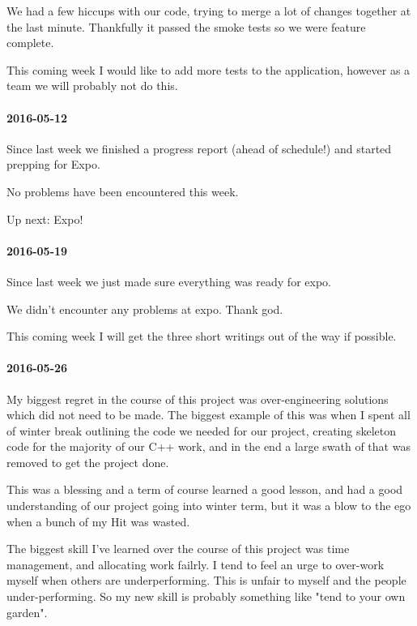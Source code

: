 We had a few hiccups with our code, trying to merge a lot of changes together at the last minute.
Thankfully it passed the smoke tests so we were feature complete.

This coming week I would like to add more tests to the application, however as a team we will probably not do this.

\paragraph{2016-05-12}

Since last week we finished a progress report (ahead of schedule!) and started prepping for Expo.

No problems have been encountered this week.

Up next: Expo!

\paragraph{2016-05-19}

Since last week we just made sure everything was ready for expo.

We didn't encounter any problems at expo.
Thank god.

This coming week I will get the three short writings out of the way if possible.

\paragraph{2016-05-26}

My biggest regret in the course of this project was over-engineering solutions which did not need to be made.
The biggest example of this was when I spent all of winter break outlining the code we needed for our project, creating skeleton code for the majority of our C++ work, and in the end a large swath of that was removed to get the project done.

This was a blessing and a term of course learned a good lesson, and had a good understanding of our project going into winter term, but it was a blow to the ego when a bunch of my  Hit was wasted.

The biggest skill I've learned over the course of this project was time management, and allocating work failrly.
I tend to feel an urge to over-work myself when others are underperforming.
This is unfair to myself and the people under-performing.
So my new skill is probably something like "tend to your own garden".


